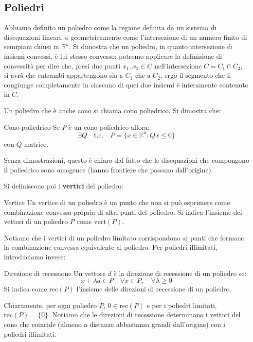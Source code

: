 \documentclass[a4paper,11pt]{article}
\begin{document}
\subsection{Poliedri}
Abbiamo definito un poliedro come la regione definita da un sistema di disequazioni lineari, o geometricamente come l'intersezione di un numero finito di semipiani chiusi in $\mathbb{R}^n$.
Si dimostra che un poliedro, in quanto intersezione di insiemi convessi, è lui stesso convesso: potremo applicare la definizione di convessità per dire che, presi due punti $x_1, x_2 \in C$ nell'intersezione $C = C_1 \cap C_2$, si avrà che entrambi appartengono sia a $C_1$ che a $C_2$, ergo il segmento che li congiunge completamente in ciascuno di quei due insiemi è interamente contenuto in $C$.

Un poliedro che è anche cono si chiama cono poliedrico. Si dimostra che:
\begin{theorem}{Cono poliedrico}
	Se $P$ è un cono poliedrico allora:
	$$
	\exists Q \quad \text{t.c.} \quad P = \{ x \in \mathbb{R}^n : Qx \leq 0 \}
	$$
	con $Q$ matrice.
\end{theorem}

Senza dimostrazioni, questo è chiaro dal fatto che le disequazioni che compongono il poliedrico sono omogenee (hanno frontiere che passano dall'origine).

Si definiscono poi i \textbf{vertici} del poliedro:
\begin{definition}{Vertice}
	Un vertice di un poliedro è un punto che non si può esprimere come combinazione convessa propria di altri punti del poliedro.
	Si indica l'insieme dei vettori di un poliedro $P$ come $\mathrm{vert}(P)$.
\end{definition}
Notiamo che i vertici di un poliedro limitato corrispondono ai punti che formano la combinazione convessa equivalente al poliedro.
Per poliedri illimitati, introduciamo invece:
\begin{definition}{Direzione di recessione}
	Un vettore $d$ è la direzione di recessione di un poliedro se:
	$$
	x + \lambda d \in P \quad \forall x \in P, \quad \forall \lambda \geq 0
	$$
	Si indica come $\mathrm{rec}(P)$ l'insieme delle direzioni di recessione di un poliedro.
\end{definition}

Chiaramente, per ogni poliedro $P$, $0 \in \mathrm{rec}(P)$ e per i poliedri limitati, $\mathrm{rec}(P) = \{0\}$.
Notiamo che le direzioni di recessione determinano i vettori del cono che coincide (almeno a distanze abbastanza grandi dall'origine) con i poliedri illimitati.
\end{document}

